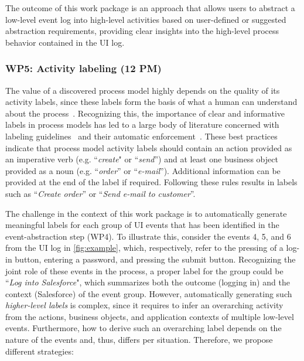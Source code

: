  The outcome of this work package is an approach that allows users to abstract a low-level event log into high-level activities based on user-defined or suggested abstraction requirements, providing clear insights into the high-level process behavior contained in the UI log.


\subsubsection{WP5: Activity labeling (12 PM)}
\label{sec:wp5}

The value of a discovered process model highly depends on the quality of its activity labels, since these labels form the basis of what a human can understand about the process~\cite{mendling2010activity}. Recognizing this,  the importance of clear and informative labels in process models has led to a large body of literature concerned with labeling guidelines~\cite{mendling2010seven,leopold2015learning} and their automatic enforcement~\cite{leopold2013detection,becker2009towards}. 
These best practices indicate that process model activity labels should contain an action provided as an imperative verb (e.g. ``\textit{create}" or ``\textit{send}'') and at least one business object provided as a noun (e.g. ``\textit{order}'' or ``\textit{e-mail}''). Additional information can be provided at the end of the label if required. Following these rules results in labels such as ``\textit{Create order}'' or ``\textit{Send e-mail to customer}''. 

The challenge in the context of this work package is to automatically generate meaningful labels for each group of UI events that has been identified in the event-abstraction step (WP4). To illustrate this, consider the events 4, 5, and 6 from the UI log in \autoref{fig:example}, which, respectively, refer to the pressing of a log-in button, entering a password, and pressing the submit button.
Recognizing the joint role of these events in the process, a proper label for the group could be ``\textit{Log into Salesforce}", which summarizes both the outcome (logging in) and the context (Salesforce) of the event group. 
However, automatically generating such \textit{higher-level labels} is complex, since it requires to infer an overarching activity from the actions, business objects, and application contexts of multiple low-level events. Furthermore, how to derive such an overarching label depends on the nature of the events and, thus, differs per situation. Therefore, we propose different strategies:

